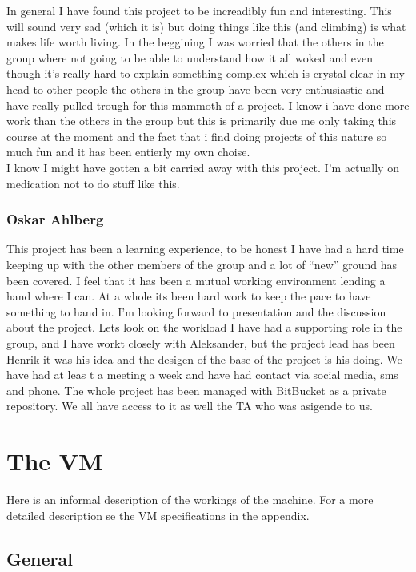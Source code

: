 \documentclass{article}
\begin{document}
In general I have found this project to be increadibly fun and interesting.
This will sound very sad (which it is) but doing things like this (and climbing)
is what makes life worth living. In the beggining I was worried that the others
in the group where not going to be able to understand how it all woked and even 
though it's really hard to explain something complex which is crystal clear in 
my head to other people the others in
the group have been very enthusiastic and have really pulled trough for this
mammoth of a project. I know i have done more work than the others in the
group but this is primarily due me only taking this course at the moment and
the fact that i find doing projects of this nature so much fun and it has been entierly my own choise.
\\
I know I might have gotten a bit carried away with this project. I'm actually on
medication not to do stuff like this.

\subsubsection{Oskar Ahlberg}
This project has been a learning experience, to be honest I have had a hard time keeping up with the other 
members of the group and a lot of ``new'' ground has been covered. I feel that
it has been a mutual working environment lending a hand where I can. At a whole its been hard work to keep the pace to have something to hand in. 
I'm looking forward to presentation and the discussion about the project. Lets look on the workload 
I have had a supporting role in the group, and I have workt closely with Aleksander, but the project lead
 has been Henrik it was his idea and the desigen of the base of the project is 
 his doing. We have had at leas t a meeting a week and have had contact via
 social media, sms and phone. The whole project has been managed with BitBucket
 as a private repository. We all have access to it as well the TA who was
 asigende to us.

\section{The VM}
Here is an informal description of the workings of the machine. For a more
detailed description se the VM specifications in the appendix.
\subsection{General}
\end{document}
